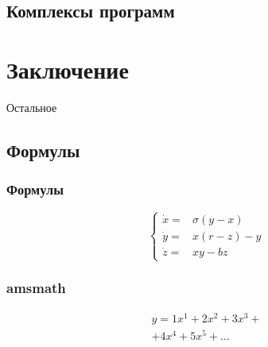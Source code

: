 \subsection{Комплексы программ}

\section{Заключение}
\begin{frame}
    \begin{center}
        \Huge
        Остальное
    \end{center}
\end{frame}

\subsection{Формулы}

\begin{frame}
    \frametitle{Формулы}
    \[
    \left\{
    \begin{array}{rl}
        \dot x = & \sigma (y-x)  \\
        \dot y = & x (r - z) - y \\
        \dot z = & xy - bz
    \end{array}
    \right.
    \]
\end{frame}

\begin{frame}
    \frametitle{amsmath}
    \centering
    \begin{minipage}[t]{0.5\linewidth}
        \begin{multline*}
            y = 1 x^1 + 2 x^2 + 3 x^3 + \\ + 4 x^4 + 5 x^5 + \dots
        \end{multline*}
    \end{minipage}
\end{frame}

